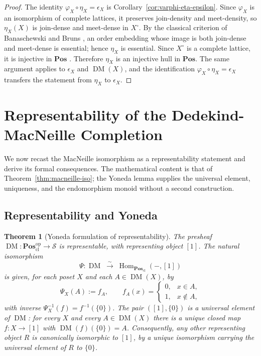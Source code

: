 \documentclass{amsart}
\theoremstyle{plain}
\newtheorem{theorem}{Theorem}[section]
\theoremstyle{definition}
\theoremstyle{remark}
\DeclareMathOperator{\DM}{DM}
\DeclareMathOperator{\Hom}{Hom}
\begin{document}
\begin{proof}
The identity $\varphi_X\circ\eta_X=\epsilon_X$ is Corollary~\ref{cor:varphi-eta-epsilon}. Since $\varphi_X$ is an isomorphism of complete lattices, it preserves join-density and meet-density, so $\eta_X(X)$ is join-dense and meet-dense in $X^\circ$. By the classical criterion of Banaschewski and Bruns \cite{banaschewski1967categorical}, an order embedding whose image is both join-dense and meet-dense is essential; hence $\eta_X$ is essential. Since $X^\circ$ is a complete lattice, it is injective in $\mathbf{Pos}$ \cite{banaschewski1967categorical,adamek2004abstract}. Therefore $\eta_X$ is an injective hull in $\mathbf{Pos}$. The same argument applies to $\epsilon_X$ and $\DM(X)$, and the identification $\varphi_X\circ\eta_X=\epsilon_X$ transfers the statement from $\eta_X$ to $\epsilon_X$.
\end{proof}

\section{Representability of the Dedekind-MacNeille Completion}\label{sec:repr}

We now recast the MacNeille isomorphism as a representability statement and derive its formal consequences. The mathematical content is that of Theorem~\ref{thm:macneille-iso}; the Yoneda lemma supplies the universal element, uniqueness, and the endomorphism monoid without a second construction.

\subsection{Representability and Yoneda}\label{subsec:yoneda}

\begin{theorem}[Yoneda formulation of representability]\label{thm:yoneda-repr}
The presheaf $\DM\colon\mathbf{Pos}_{\mathrm{cl}}^{\mathrm{op}}\to\mathcal{S}$ is representable, with representing object $[1]$. The natural isomorphism
\[
\Psi\colon\DM\;\xrightarrow{\ \sim\ }\;\Hom_{\mathbf{Pos}_{\mathrm{cl}}}(-,[1])
\]
is given, for each poset $X$ and each $A\in\DM(X)$, by
\[
\Psi_X(A):=f_A,\qquad
f_A(x)=\begin{cases}0,&x\in A,\\ 1,&x\notin A,\end{cases}
\]
with inverse $\Psi_X^{-1}(f)=f^{-1}(\{0\})$. The pair $([1],\{0\})$ is a universal element of $\DM$: for every $X$ and every $A\in\DM(X)$ there is a unique closed map $f\colon X\to[1]$ with $\DM(f)(\{0\})=A$. Consequently, any other representing object $R$ is canonically isomorphic to $[1]$, by a unique isomorphism carrying the universal element of $R$ to $\{0\}$.
\end{theorem}
\end{document}
